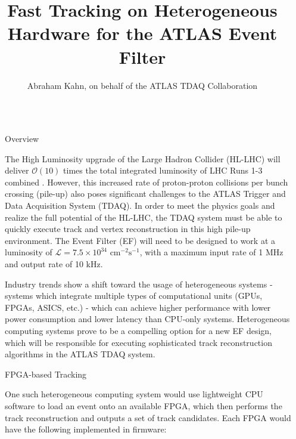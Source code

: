 \documentclass[final]{beamer}
\title{Fast Tracking on Heterogeneous Hardware for the ATLAS Event Filter}
\author{Abraham Kahn, on behalf of the ATLAS TDAQ Collaboration}
\newlength{\sepwidth}
\newlength{\colwidth}
\newcommand{\separatorcolumn}{\begin{column}{\sepwidth}\end{column}}
\begin{document}
\begin{frame}[t]
\begin{columns}[t]
\separatorcolumn

\begin{column}{\colwidth}

  \begin{block}{Overview}

    The High Luminosity upgrade of the Large Hadron Collider (HL-LHC) will deliver $\mathcal{O}(10)$ times the total integrated luminosity
    of LHC Runs 1-3 combined \cite{TDR}. However, this increased rate of proton-proton collisions per bunch crossing (pile-up) also poses
    significant challenges to the ATLAS Trigger and Data Acquisition System (TDAQ). In order to meet the physics goals and realize the 
    full potential of the HL-LHC, the TDAQ system must be able to quickly execute track and vertex reconstruction in this high pile-up environment.
    The Event Filter (EF) will need to be designed to work at a luminosity of 
    $\mathcal{L} = 7.5 \times 10^{34} \text{ cm}^{-2}\text{s}^{-1}$, with a maximum input rate of 1 MHz and output rate of 10 kHz.

    Industry trends show a shift toward the usage of heterogeneous systems - systems which integrate multiple types of computational units (GPUs, FPGAs, ASICS, etc.)
     - which can achieve higher performance with lower power consumption and lower latency than CPU-only systems. Heterogeneous computing systems prove to be a compelling option 
    for a new EF design, which will be responsible for executing sophisticated track reconstruction algorithms in the ATLAS TDAQ system. 

  \end{block}

  \begin{block}{FPGA-based Tracking}

    One such heterogeneous computing system would use lightweight CPU software to load an event onto an available
    FPGA, which then performs the track reconstruction and outputs a set of track candidates. Each FPGA would 
    have the following implemented in firmware:
    

\end{block}
\end{column}
\end{columns}
\end{frame}
\end{document}
